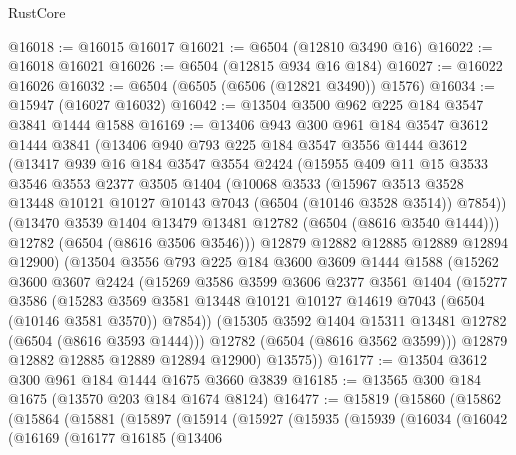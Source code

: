 \begin{lexlean}{RustCore}
\begin{coremodule}
@16018 := @16015 @16017
@16021 := @6504 (@12810 @3490 @16)
@16022 := @16018 @16021
@16026 := @6504 (@12815 @934 @16 @184)
@16027 := @16022 @16026
@16032 := @6504 (@6505 (@6506 (@12821 @3490)) @1576)
@16034 := @15947 (@16027 @16032)
@16042 := @13504 @3500 @962 @225 @184 @3547 @3841 @1444 @1588
@16169 := @13406
    @943
    @300
    @961
    @184
    @3547
    @3612
    @1444
    @3841
    (@13406
      @940
      @793
      @225
      @184
      @3547
      @3556
      @1444
      @3612
      (@13417
        @939
        @16
        @184
        @3547
        @3554
        @2424
        (@15955
          @409
          @11
          @15
          @3533
          @3546
          @3553
          @2377
          @3505
          @1404
          (@10068
            @3533
            (@15967
              @3513
              @3528
              @13448
              @10121
              @10127
              @10143
              @7043
              (@6504 (@10146 @3528 @3514))
              @7854))
          (@13470 @3539 @1404 @13479 @13481 @12782 (@6504 (@8616 @3540 @1444)))
          @12782
          (@6504 (@8616 @3506 @3546)))
        @12879
        @12882
        @12885
        @12889
        @12894
        @12900)
      (@13504
        @3556
        @793
        @225
        @184
        @3600
        @3609
        @1444
        @1588
        (@15262
          @3600
          @3607
          @2424
          (@15269
            @3586
            @3599
            @3606
            @2377
            @3561
            @1404
            (@15277
              @3586
              (@15283
                @3569
                @3581
                @13448
                @10121
                @10127
                @14619
                @7043
                (@6504 (@10146 @3581 @3570))
                @7854))
            (@15305 @3592 @1404 @15311 @13481 @12782 (@6504 (@8616 @3593 @1444)))
            @12782
            (@6504 (@8616 @3562 @3599)))
          @12879
          @12882
          @12885
          @12889
          @12894
          @12900)
        @13575))
@16177 := @13504 @3612 @300 @961 @184 @1444 @1675 @3660 @3839
@16185 := @13565 @300 @184 @1675 (@13570 @203 @184 @1674 @8124)
@16477 := @15819
    (@15860
      (@15862
        (@15864
          (@15881
            (@15897
              (@15914
                (@15927
                  (@15935
                    (@15939
                      (@16034
                        (@16042
                          (@16169
                            (@16177
                              @16185
                              (@13406

\end{coremodule}
\end{lexlean}
